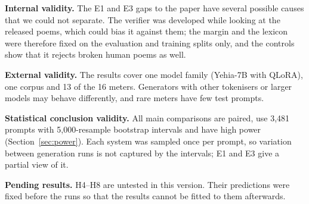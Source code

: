 \textbf{Internal validity.} The E1 and E3 gaps to the paper have several possible causes that we could not separate.
The verifier was developed while looking at the released poems, which could bias it against them; the margin and the
lexicon were therefore fixed on the evaluation and training splits only, and the controls show that it rejects broken
human poems as well.

\textbf{External validity.} The results cover one model family (Yehia-7B with QLoRA), one corpus and 13 of the 16
meters. Generators with other tokenisers or larger models may behave differently, and rare meters have few test
prompts.

\textbf{Statistical conclusion validity.} All main comparisons are paired, use 3,481 prompts with 5,000-resample
bootstrap intervals and have high power (Section~\ref{sec:power}). Each system was sampled once per prompt, so variation
between generation runs is not captured by the intervals; E1 and E3 give a partial view of it.

\textbf{Pending results.} H4--H8 are untested in this version. Their predictions were fixed before the runs so that the
results cannot be fitted to them afterwards.
